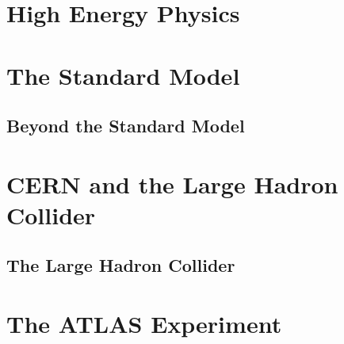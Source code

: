 

\section{High Energy Physics}


\section{The Standard Model}


\subsection{Beyond the Standard Model}


\section{CERN and the Large Hadron Collider}


\subsection{The Large Hadron Collider}


\section{The ATLAS Experiment}

